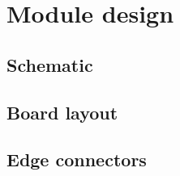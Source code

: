 
\section{Module design}

\subsection{Schematic}

\subsection{Board layout}

\subsection{Edge connectors}



